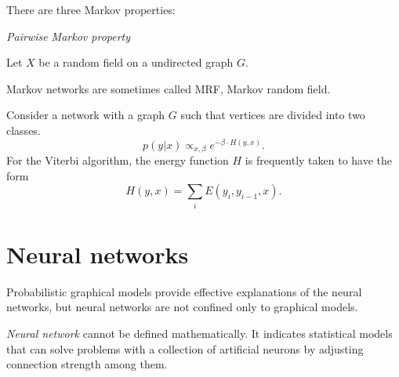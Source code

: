 \documentclass{../exp}
\begin{document}
\begin{defn}
There are three Markov properties:
\begin{cond}
\item \emph{Pairwise Markov property}
\end{cond}
\end{defn}

\begin{defn}
Let $X$ be a random field on a undirected graph $G$.

\end{defn}
Markov networks are sometimes called MRF, Markov random field.

\begin{ex}

\end{ex}

\begin{ex}
Consider a network with a graph $G$ such that vertices are divided into two classes.
\[p(y|x)\propto_{x,\beta}e^{-\beta\cdot H(y,x)}.\]
For the Viterbi algorithm, the energy function $H$ is frequently taken to have the form
\[H(y,x)=\sum_iE(y_i,y_{i-1},x).\]
\end{ex}

\section{Neural networks}
Probabilistic graphical models provide effective explanations of the neural networks, but neural networks are not confined only to graphical models.
\begin{defn}
\emph{Neural network} cannot be defined mathematically.
It indicates statistical models that can solve problems with a collection of artificial neurons by adjusting connection strength among them.
\end{defn}

\begin{ex}

\end{ex}

\begin{ex}

\end{ex}
\end{document}
